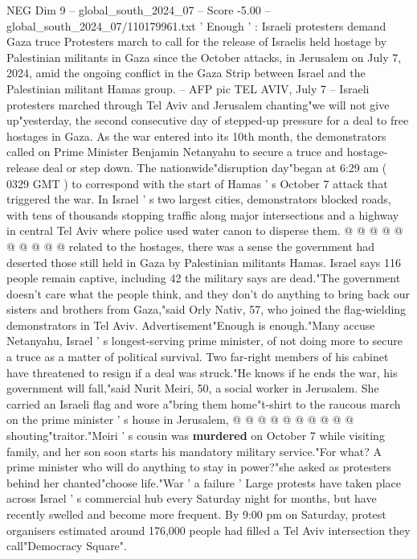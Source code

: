 \begin{textsample}{NEG Dim 9 – global\_south\_2024\_07 – Score -5.00 – global\_south\_2024\_07/110179961.txt}  \label{ex:f9_neg_332}
' Enough ' : Israeli protesters demand Gaza truce Protesters march to call for the release of Israelis held hostage by Palestinian militants in Gaza since the October attacks, in Jerusalem on July 7, 2024, amid the ongoing conflict in the Gaza Strip between Israel and the Palestinian militant Hamas group. -- AFP pic TEL AVIV, July 7 -- Israeli protesters marched through Tel Aviv and Jerusalem chanting"we will not give up"yesterday, the second consecutive day of stepped-up pressure for a deal to free hostages in Gaza.
As the war entered into its 10th month, the demonstrators called on Prime Minister Benjamin Netanyahu to secure a truce and hostage-release deal or step down.
The nationwide"disruption day"began at 6:29 am ( 0329 GMT ) to correspond with the start of Hamas ' s October 7 attack that triggered the war.
In Israel ' s two largest cities, demonstrators blocked roads, with tens of thousands stopping traffic along major intersections and a highway in central Tel Aviv where police used water canon to disperse them. @ @ @ @ @ @ @ @ @ @ related to the hostages, there was a sense the government had deserted those still held in Gaza by Palestinian militants Hamas.
Israel says 116 people remain captive, including 42 the military says are dead."The government doesn't care what the people think, and they don't do anything to bring back our sisters and brothers from Gaza,"said Orly Nativ, 57, who joined the flag-wielding demonstrators in Tel Aviv.
Advertisement"Enough is enough."Many accuse Netanyahu, Israel ' s longest-serving prime minister, of not doing more to secure a truce as a matter of political survival.
Two far-right members of his cabinet have threatened to resign if a deal was struck."He knows if he ends the war, his government will fall,"said Nurit Meiri, 50, a social worker in Jerusalem.
She carried an Israeli flag and wore a"bring them home"t-shirt to the raucous march on the prime minister ' s house in Jerusalem, @ @ @ @ @ @ @ @ @ @ shouting"traitor."Meiri ' s cousin was \textbf{murdered} on October 7 while visiting family, and her son soon starts his mandatory military service."For what?
A prime minister who will do anything to stay in power?"she asked as protesters behind her chanted"choose life."War ' a failure ' Large protests have taken place across Israel ' s commercial hub every Saturday night for months, but have recently swelled and become more frequent.
By 9:00 pm on Saturday, protest organisers estimated around 176,000 people had filled a Tel Aviv intersection they call"Democracy Square".

\end{textsample}
